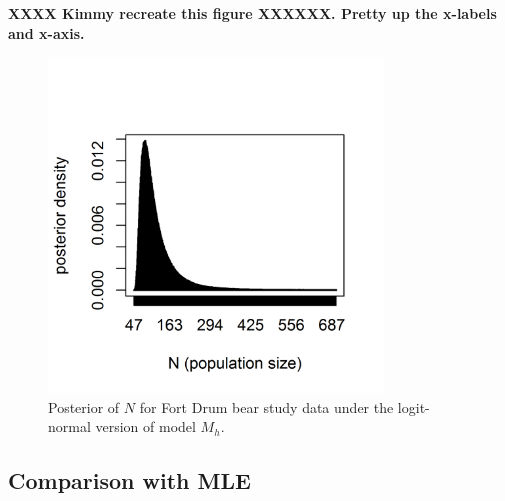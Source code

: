 {\bf XXXX Kimmy recreate this figure XXXXXX. Pretty up the x-labels
  and x-axis. }

\begin{figure}
\centering
\includegraphics[height=3.5in,width=3.5in]{Ch3-Closed/figs/bear-modelMh-post}
\caption{Posterior of $N$ for Fort Drum bear study data under the
logit-normal version of model $M_h$.
}
\label{closed.fig.bearMh}
\end{figure}

\subsection{Comparison with MLE}

